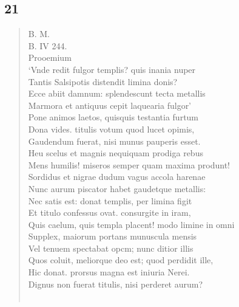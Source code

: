 \documentclass[11pt, a4paper]{report}
\begin{document}
            \subsection*{21}
      \begin{verse}
      B. M. \\ B. IV 244. \\  \lbrack Prooemium \rbrack  \\ ‘Vnde redit fulgor templis? quis inania nuper \\ Tantis Salsipotis distendit limina donis? \\ Ecce abiit damnum: splendescunt tecta metallis \\ Marmora et antiquus cepit laquearia fulgor’ \\ Pone animos laetos, quisquis testantia furtum \\ Dona vides. titulis votum quod lucet opimis, \\ Gaudendum fuerat, nisi munus pauperis esset. \\ Heu scelus et magnis nequiquam prodiga rebus \\ Mens humilis! miseros semper quam maxima produnt! \\ Sordidus et nigrae dudum vagus accola harenae \\ Nunc aurum piscator habet gaudetque metallis: \\ Nec satis est: donat templis, per limina figit \\ Et titulo confessus ovat. consurgite in iram, \\ Quis caelum, quis templa placent! modo limine in omni \\ Supplex, maiorum portans munuscula mensis \\ Vel tenuem spectabat opcm; nunc ditior illis \\ Quos coluit, meliorque deo est; quod perdidit ille, \\ Hic donat. prorsus magna est iniuria Nerei. \\ Dignus non fuerat titulis, nisi perderet aurum? \\ 
        ﻿\pagebreak 

\end{verse}
\end{document}
